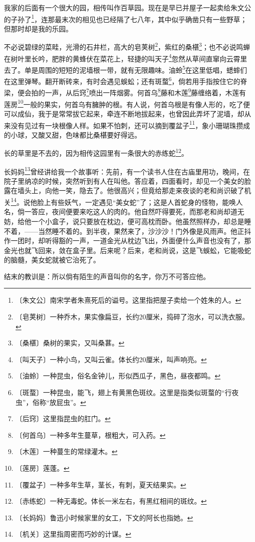 \documentclass[12pt,UTF-8,openany]{ctexbook}
\begin{document}
\begin{normalsize}
    
    我家的后面有一个很大的园，相传叫作百草园。现在是早已并屋子一起卖给朱文公的子孙了\footnote{〔朱文公〕南宋学者朱熹死后的谥号。这里指把屋子卖给一个姓朱的人。}，连那最末次的相见也已经隔了七八年，其中似乎确凿只有一些野草；但那时却是我的乐园。
    
    不必说碧绿的菜畦，光滑的石井栏，高大的皂荚树\footnote{〔皂荚树〕一种乔木，果实像扁豆，长约20厘米，捣碎了泡水，可以洗衣服。}，紫红的桑椹\footnote{〔桑椹〕桑树的果实，又叫桑葚。}；也不必说鸣蝉在树叶里长吟，肥胖的黄蜂伏在菜花上，轻捷的叫天子\footnote{〔叫天子〕一种小鸟，又叫云雀。体长约20厘米，叫声响亮。}忽然从草间直窜向云霄里去了。单是周围的短短的泥墙根一带，就有无限趣味。油蛉\footnote{〔油蛉〕一种昆虫，俗名金钟儿，形似西瓜子，黑色，昼夜都鸣。}在这里低唱，蟋蟀们在这里弹琴。翻开断砖来，有时会遇见蜈蚣；还有斑蝥\footnote{〔斑蝥〕一种昆虫，能飞，翅上有黄黑色斑纹。这里是指类似斑蝥的“行夜虫”，俗称“放屁虫”。}，倘若用手指按住它的脊梁，便会拍的一声，从后窍\footnote{〔后窍〕这里指昆虫的肛门。}喷出一阵烟雾。何首乌\footnote{〔何首乌〕一种多年生蔓草，根粗大，可入药。}藤和木莲\footnote{〔木莲〕一种蔓生的常绿灌木。}藤缠络着，木莲有莲房\footnote{〔莲房〕莲蓬。}一般的果实，何首乌有臃肿的根。有人说，何首乌根是有像人形的，吃了便可以成仙，我于是常常拔它起来，牵连不断地拔起来，也曾因此弄坏了泥墙，却从来没有见过有一块根像人样。如果不怕刺，还可以摘到覆盆子\footnote{〔覆盆子〕一种多年生草，茎长，有刺，夏天结果实。}，象小珊瑚珠攒成的小球，又酸又甜，色味都比桑椹要好得远。
    
    长的草里是不去的，因为相传这园里有一条很大的赤练蛇\footnote{〔赤练蛇〕一种无毒蛇。体长一米左右，有黑红相间的斑纹。}。
    
    长妈妈\footnote{〔长妈妈〕鲁迅小时候家里的女工，下文的阿长也指她。}曾经讲给我一个故事听：先前，有一个读书人住在古庙里用功，晚间，在院子里纳凉的时候，突然听到有人在叫他。答应着，四面看时，却见一个美女的脸露在墙头上，向他一笑，隐去了。他很高兴；但竟给那走来夜谈的老和尚识破了机关\footnote{〔机关〕这里指周密而巧妙的计谋。}。说他脸上有些妖气，一定遇见“美女蛇”了；这是人首蛇身的怪物，能唤人名，倘一答应，夜间便要来吃这人的肉的。他自然吓得要死，而那老和尚却道无妨，给他一个小盒子，说只要放在枕边，便可高枕而卧。他虽然照样办，却总是睡不着，——当然睡不着的。到半夜，果然来了，沙沙沙！门外像是风雨声。他正抖作一团时，却听得豁的一声，一道金光从枕边飞出，外面便什么声音也没有了，那金光也就飞回来，敛在盒子里。后来呢？后来，老和尚说，这是飞蜈蚣，它能吸蛇的脑髓，美女蛇就被它治死了。
    
    结末的教训是：所以倘有陌生的声音叫你的名字，你万不可答应他。
    

\end{normalsize}
\end{document}

